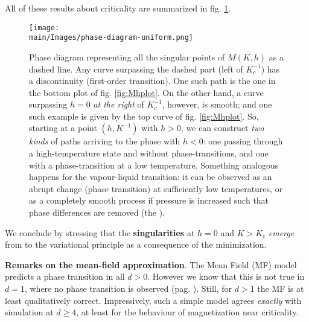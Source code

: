 \documentclass[../../main.tex]{subfiles}
\begin{document}
All of these results about criticality are summarized in fig. \ref{fig:phase-diagram-uniform}.

\begin{figure}[H]
    \centering
    \texttt{[image: \\main/Images/phase-diagram-uniform.png]}
    \caption{Phase diagram representing all the singular points of $M(K,h)$ as a dashed line. Any curve surpassing the dashed part (left of $K_c^{-1}$) has a discontinuity (first-order transition). One such path is the one in the bottom plot of fig. \ref{fig:Mhplot}. On the other hand, a curve surpassing $h=0$ \textit{at the right} of $K_c^{-1}$, however, is smooth; and one such example is given by the top curve of fig. \ref{fig:Mhplot}. So, starting at a point $(h, K^{-1})$ with $h>0$, we can construct \textit{two kinds} of paths arriving to the phase with $h < 0$: one passing through a high-temperature state and without phase-transitions, and one with a phase-transition at a low temperature.
    Something analogous happens for the vapour-liquid transition: it can be observed as an abrupt change (phase transition) at sufficiently low temperatures, or as a completely smooth process if pressure is increased such that phase differences are removed (the ).}
    \label{fig:phase-diagram-uniform}
\end{figure}

We conclude by stressing that the \textbf{singularities} at $h=0$ and $K > K_c$ \textit{emerge} from to the variational principle as a consequence of the minimization.  

\begin{appr}\textbf{Remarks on the mean-field approximation}. The Mean Field (MF) model predicts a phase transition in all $d > 0$. However we know that this is not true in $d=1$, where no phase transition is observed (pag. \pageref{par:no-phase-transition}). Still, for $d > 1$ the MF is at least qualitatively correct. Impressively, such a simple model agrees \textit{exactly} with simulation at $d \geq 4$, at least for the behaviour of magnetization near criticality. 
\end{appr}
\end{document}
